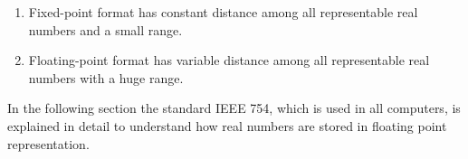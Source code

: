 \begin{IN}
    \begin{enumerate}
        \item Fixed-point format has constant distance among all representable real numbers and a small range. 
        \item Floating-point format has variable distance among all representable real numbers with a huge range.  
    \end{enumerate}
\end{IN}


In the following section the standard IEEE 754, which is used in all computers, is 
explained in detail to understand how real numbers are stored in floating point representation.



%








